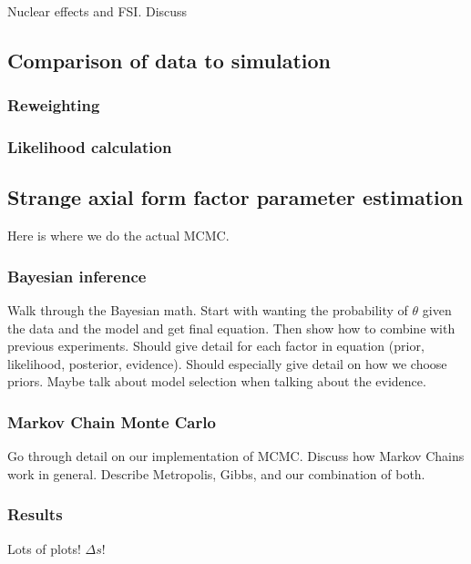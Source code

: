   \subsubsection{}
    Nuclear effects and FSI. Discuss 

\subsection{Comparison of data to simulation}
  \subsubsection{Reweighting}
  \subsubsection{Likelihood calculation}

\subsection{Strange axial form factor parameter estimation}\label{deltas}
  Here is where we do the actual MCMC.
  \subsubsection{Bayesian inference}
    Walk through the Bayesian math. Start with wanting the probability of
    $\theta$ given the data and the model and get final equation. Then show how
    to combine with previous experiments. Should give detail for each factor in
    equation (prior, likelihood, posterior, evidence). Should especially give
    detail on how we choose priors. Maybe talk about model selection when
    talking about the evidence.
  \subsubsection{Markov Chain Monte Carlo}
    Go through detail on our implementation of MCMC. Discuss how Markov Chains
    work in general. Describe Metropolis, Gibbs, and our combination of both.
  \subsubsection{Results}
    Lots of plots! $\Delta s$!


